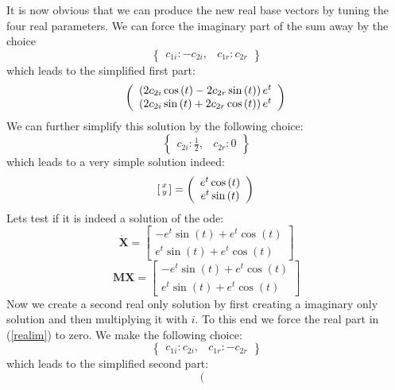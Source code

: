          It is now obvious that we can produce the new real base vectors by tuning the four real parameters.	  We can force the imaginary part of the sum away by the choice\[\begin{Bmatrix}c_{1i} : - c_{2i}, & c_{1r} : c_{2r}\end{Bmatrix}\]which leads to the simplified first part:\[\left(\begin{array}{c}
\left(2 c_{2i} \cos{\left (t \right )} - 2 c_{2r} \sin{\left (t \right )}\right) e^{t} \\ \left(2 c_{2i} \sin{\left (t \right )} + 2 c_{2r} \cos{\left (t \right )}\right) e^{t}\end{array}\right)\nonumber \\\]          We can further simplify this solution by the following choice:\[\begin{Bmatrix}c_{2i} : \frac{1}{2}, & c_{2r} : 0\end{Bmatrix}\]which leads to a very simple solution indeed:\[\left[\begin{smallmatrix}x\\y\end{smallmatrix}\right]=\left(\begin{array}{c}
e^{t} \cos{\left (t \right )} \\ e^{t} \sin{\left (t \right )}\end{array}\right)\nonumber \\\]         Lets test if it is indeed a solution of the ode:\[\mathbf{\dot X}=\left[\begin{smallmatrix}- e^{t} \sin{\left (t \right )} + e^{t} \cos{\left (t \right )}\\e^{t} \sin{\left (t \right )} + e^{t} \cos{\left (t \right )}\end{smallmatrix}\right]\]\[\mathbf{MX}=\left[\begin{smallmatrix}- e^{t} \sin{\left (t \right )} + e^{t} \cos{\left (t \right )}\\e^{t} \sin{\left (t \right )} + e^{t} \cos{\left (t \right )}\end{smallmatrix}\right]\]         Now we create a second real only solution by first creating a imaginary only solution and then multiplying it with $i$.	 To this end we force the real part in (\ref{realim}) to zero.         We make the following choice:\[\begin{Bmatrix}c_{1i} : c_{2i}, & c_{1r} : - c_{2r}\end{Bmatrix}\]which leads to the simplified second part:\[\left(\begin{array}{c}

\end{array}\]
